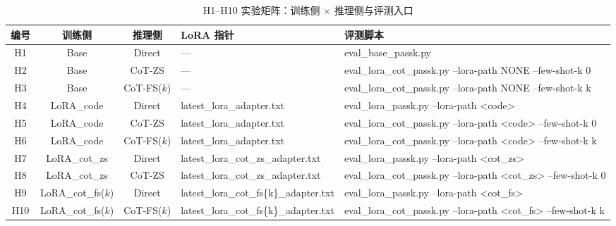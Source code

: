 \begin{table}[!htb]
  \centering
  \caption{H1--H10 实验矩阵：训练侧 $\times$ 推理侧与评测入口}
  \label{tab:ch4-matrix}
  \scriptsize
  \setlength{\tabcolsep}{2.5pt}
  \renewcommand{\arraystretch}{1.2}
  \hspace*{-2.5cm}%
  \begin{tabular}{c c c p{5cm} p{9cm}}
    \toprule
    编号 & 训练侧 & 推理侧 & LoRA 指针 & 评测脚本 \\
    \midrule
    H1  & Base               & Direct      & ---                                       & eval\_base\_passk.py \\
    H2  & Base               & CoT-ZS      & ---                                       & eval\_lora\_cot\_passk.py  --lora-path NONE  --few-shot-k 0 \\
    H3  & Base               & CoT-FS($k$) & ---                                       & eval\_lora\_cot\_passk.py  --lora-path NONE  --few-shot-k k \\
    H4  & LoRA\_code         & Direct      & latest\_lora\_adapter.txt        & eval\_lora\_passk.py  --lora-path <code> \\
    H5  & LoRA\_code         & CoT-ZS      & latest\_lora\_adapter.txt        & eval\_lora\_cot\_passk.py  --lora-path <code>  --few-shot-k 0 \\
    H6  & LoRA\_code         & CoT-FS($k$) & latest\_lora\_adapter.txt        & eval\_lora\_cot\_passk.py  --lora-path <code>  --few-shot-k k \\
    H7  & LoRA\_cot\_zs      & Direct      & latest\_lora\_cot\_zs\_adapter.txt & eval\_lora\_passk.py  --lora-path <cot\_zs> \\
    H8  & LoRA\_cot\_zs      & CoT-ZS      & latest\_lora\_cot\_zs\_adapter.txt & eval\_lora\_cot\_passk.py  --lora-path <cot\_zs>  --few-shot-k 0 \\
    H9  & LoRA\_cot\_fs($k$) & Direct      & latest\_lora\_cot\_fs\{k\}\_adapter.txt & eval\_lora\_passk.py  --lora-path <cot\_fs> \\
    H10 & LoRA\_cot\_fs($k$) & CoT-FS($k$) & latest\_lora\_cot\_fs\{k\}\_adapter.txt & eval\_lora\_cot\_passk.py  --lora-path <cot\_fs>  --few-shot-k k \\
    \bottomrule
  \end{tabular}
\end{table}


